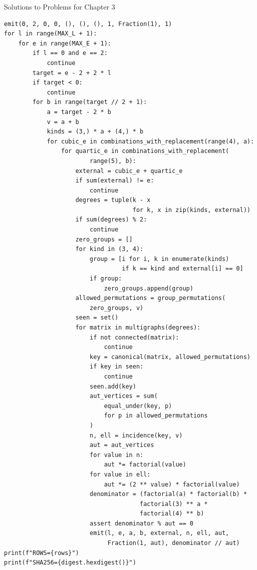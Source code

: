\begin{bankssolutions}{Solutions to Problems for Chapter 3}
\begin{verbatim}
emit(0, 2, 0, 0, (), (), (), 1, Fraction(1), 1)
for l in range(MAX_L + 1):
    for e in range(MAX_E + 1):
        if l == 0 and e == 2:
            continue
        target = e - 2 + 2 * l
        if target < 0:
            continue
        for b in range(target // 2 + 1):
            a = target - 2 * b
            v = a + b
            kinds = (3,) * a + (4,) * b
            for cubic_e in combinations_with_replacement(range(4), a):
                for quartic_e in combinations_with_replacement(
                        range(5), b):
                    external = cubic_e + quartic_e
                    if sum(external) != e:
                        continue
                    degrees = tuple(k - x
                                    for k, x in zip(kinds, external))
                    if sum(degrees) % 2:
                        continue
                    zero_groups = []
                    for kind in (3, 4):
                        group = [i for i, k in enumerate(kinds)
                                 if k == kind and external[i] == 0]
                        if group:
                            zero_groups.append(group)
                    allowed_permutations = group_permutations(
                        zero_groups, v)
                    seen = set()
                    for matrix in multigraphs(degrees):
                        if not connected(matrix):
                            continue
                        key = canonical(matrix, allowed_permutations)
                        if key in seen:
                            continue
                        seen.add(key)
                        aut_vertices = sum(
                            equal_under(key, p)
                            for p in allowed_permutations
                        )
                        n, ell = incidence(key, v)
                        aut = aut_vertices
                        for value in n:
                            aut *= factorial(value)
                        for value in ell:
                            aut *= (2 ** value) * factorial(value)
                        denominator = (factorial(a) * factorial(b) *
                                      factorial(3) ** a *
                                      factorial(4) ** b)
                        assert denominator % aut == 0
                        emit(l, e, a, b, external, n, ell, aut,
                             Fraction(1, aut), denominator // aut)
print(f"ROWS={rows}")
print(f"SHA256={digest.hexdigest()}")
\end{verbatim}
\endgroup


\end{bankssolutions}
